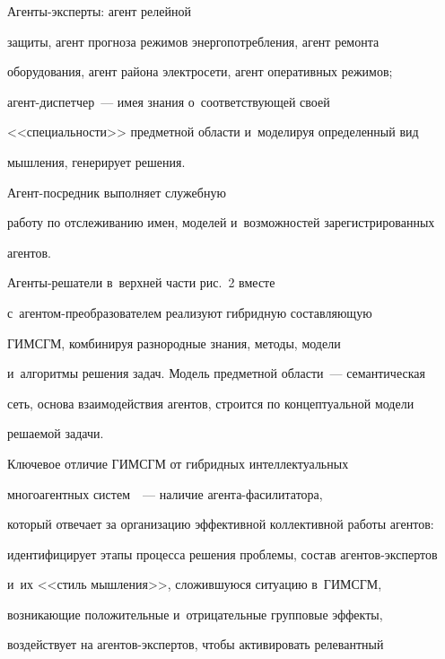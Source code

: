 Агенты-эксперты: агент релейной 


защиты, агент прогноза режимов энергопотребления, агент ремонта 


оборудования, агент района электросети, агент оперативных режимов;  


агент-дис\-пет\-чер~--- имея знания о~соответствующей своей 


<<спе\-ци\-аль\-ности>> предметной об\-ласти и~моделируя определенный вид 


мышления, генерирует решения. 





Агент-по\-сред\-ник выполняет служебную 


работу по отслеживанию имен, моделей и~возможностей зарегистрированных 


агентов. 





Агенты-решатели в~верхней части рис.~2 вместе  


с~аген\-том-пре\-об\-ра\-зо\-ва\-те\-лем реализуют гибридную составляющую 


\mbox{ГИМСГМ}, комбинируя разнородные знания, методы, модели 


и~алгоритмы решения задач. Модель предметной области~--- семантическая 


сеть, основа взаимодействия агентов, строится по концептуальной модели 


решаемой задачи. 


  











  Ключевое отличие ГИМСГМ от гибридных интеллектуальных 


многоагентных систем~\cite{17-kl}~--- наличие аген\-та-фа\-си\-ли\-та\-то\-ра, 


который отвечает за организацию эффективной коллективной работы агентов: 


идентифицирует этапы процесса решения проблемы, состав агентов-экспертов 


и~их <<стиль мышления>>, сложившуюся ситуацию в~\mbox{ГИМСГМ}, 


возникающие положительные и~отрицательные групповые эффекты, 


воздействует на аген\-тов-экс\-пер\-тов, чтобы активировать релевантный 


